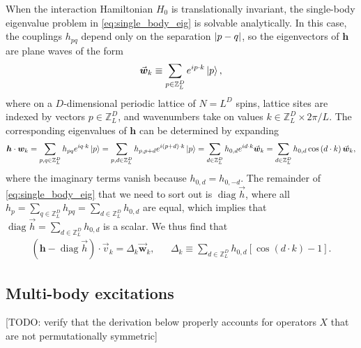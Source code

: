 \documentclass[nofootinbib,notitlepage,11pt]{revtex4-2}
\newcommand{\p}[1]{\left(#1\right)} %
\renewcommand{\sp}[1]{\left[#1\right]} %
\renewcommand{\c}{\cdot} %
\newcommand{\m}{\bm} %
\renewcommand{\v}{\vec} %
\newcommand{\1}{\mathds{1}}
\newcommand{\ZZ}{\mathbb{Z}}
\DeclareMathOperator{\diag}{diag}
\newcommand{\red}[1]{{\color{red} #1}}
\begin{document}
When the interaction Hamiltonian $H_0$ is translationally invariant,
the single-body eigenvalue problem in \eqref{eq:single_body_eig} is
solvable analytically.  In this case, the couplings $h_{pq}$ depend
only on the separation $\abs{p-q}$, so the eigenvectors of $\m h$ are
plane waves of the form
\begin{align}
  \v{\m w}_k \equiv \sum_{p\in\ZZ_L^D} e^{ip\c k} \ket{p},
\end{align}
where on a $D$-dimensional periodic lattice of $N=L^D$ spins, lattice
sites are indexed by vectors $p\in\ZZ_L^D$, and wavenumbers take on
values $k\in\ZZ_L^D\times2\pi/L$.  The corresponding eigenvalues of
$\m h$ can be determined by expanding
\begin{align}
  \m h\c{\m w}_k
  = \sum_{p,q\in\ZZ_L^D} h_{pq} e^{iq\c k} \ket{p}
  = \sum_{p,d\in\ZZ_L^D} h_{p,p+d} e^{i\p{p+d}\c k} \ket{p}
  = \sum_{d\in\ZZ_L^D} h_{0,d} e^{id\c k} \v{\m w}_k
  = \sum_{d\in\ZZ_L^D} h_{0,d} \cos\p{d\c k} \v{\m w}_k,
\end{align}
where the imaginary terms vanish because $h_{0,d}=h_{0,-d}$.  The
remainder of \eqref{eq:single_body_eig} that we need to sort out is
$\diag\v h$, where all
$h_p=\sum_{q\in\ZZ_L^D}h_{pq}=\sum_{d\in\ZZ_L^D}h_{0,d}$ are equal,
which implies that $\diag\v h=\sum_{d\in\ZZ_L^D}h_{0,d}$ is a scalar.
We thus find that
\begin{align}
  \p{\m h - \diag\v h}\c\v v_k = \Delta_k \v{\m w}_k,
  &&
  \Delta_k \equiv \sum_{d\in\ZZ_L^D} h_{0,d} \sp{\cos\p{d\c k}-1}.
\end{align}

\subsection{Multi-body excitations}
\label{sec:multi_body_eigenstates}

\red{[TODO: verify that the derivation below properly accounts for
  operators $X$ that are not permutationally symmetric]}
\end{document}
